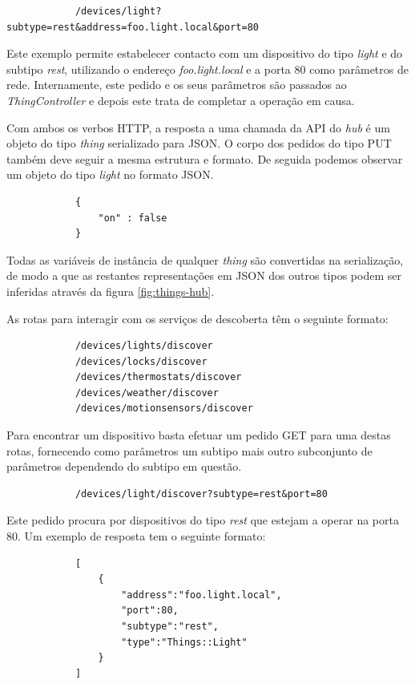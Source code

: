 \begin{verbatim}
            /devices/light?subtype=rest&address=foo.light.local&port=80
\end{verbatim}

Este exemplo permite estabelecer contacto com um dispositivo do tipo \textit{light} e do subtipo \textit{rest}, utilizando o endereço \textit{foo.light.local} e a porta 80 como parâmetros de rede. Internamente, este pedido e os seus parâmetros são passados ao \textit{ThingController} e depois este trata de completar a operação em causa.

Com ambos os verbos HTTP, a resposta a uma chamada da API do \textit{hub} é um objeto do tipo \textit{thing} serializado para JSON. O corpo dos pedidos do tipo PUT também deve seguir a mesma estrutura e formato. De seguida podemos observar um objeto do tipo \textit{light} no formato JSON.

\begin{verbatim}
            {
                "on" : false
            }
\end{verbatim}

Todas as variáveis de instância de qualquer \textit{thing} são convertidas na serialização, de modo a que as restantes representações em JSON dos outros tipos podem ser inferidas através da figura \ref{fig:things-hub}.

As rotas para interagir com os serviços de descoberta têm o seguinte formato:

\begin{verbatim}
            /devices/lights/discover
            /devices/locks/discover
            /devices/thermostats/discover
            /devices/weather/discover
            /devices/motionsensors/discover
\end{verbatim}

Para encontrar um dispositivo basta efetuar um pedido GET para uma destas rotas, fornecendo como parâmetros um subtipo mais outro subconjunto de parâmetros dependendo do subtipo em questão.

\begin{verbatim}
            /devices/light/discover?subtype=rest&port=80
\end{verbatim}

Este pedido procura por dispositivos do tipo \textit{rest} que estejam a operar na porta 80. Um exemplo de resposta tem o seguinte formato:

\begin{verbatim}
            [
                {
                    "address":"foo.light.local",
                    "port":80,
                    "subtype":"rest",
                    "type":"Things::Light"
                }
            ]
\end{verbatim}

